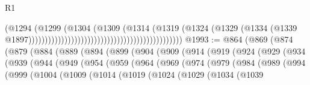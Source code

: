 \begin{lexlean}{R1}
\begin{coremodule}
{{{{{{{{{{{{{{{{{{{{{{{{{{{{{{{{{{{{{{{{                                                                              (@1294
                                                                                (@1299
                                                                                  (@1304
                                                                                    (@1309
                                                                                      (@1314
                                                                                        (@1319
                                                                                          (@1324
                                                                                            (@1329
                                                                                              (@1334
                                                                                                (@1339
                                                                                                  @1897)))))))))))))))))))))))))))))))))))))))))))))))
@1993 := @864
    (@869
      (@874
        (@879
          (@884
            (@889
              (@894
                (@899
                  (@904
                    (@909
                      (@914
                        (@919
                          (@924
                            (@929
                              (@934
                                (@939
                                  (@944
                                    (@949
                                      (@954
                                        (@959
                                          (@964
                                            (@969
                                              (@974
                                                (@979
                                                  (@984
                                                    (@989
                                                      (@994
                                                        (@999
                                                          (@1004
                                                            (@1009
                                                              (@1014
                                                                (@1019
                                                                  (@1024
                                                                    (@1029
                                                                      (@1034
                                                                        (@1039
}}}}}}}}}}}}}}}}}}}}}}}}}}}}}}}}}}}}}}}}
\end{coremodule}
\end{lexlean}
